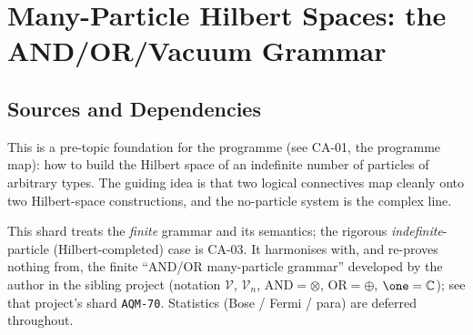 
\section{Many-Particle Hilbert Spaces: the AND/OR/Vacuum Grammar}
\label{sec:and-or-vacuum-grammar}

\subsection{Sources and Dependencies}

This is a pre-topic foundation for the programme (see CA-01, the programme map):
how to build the Hilbert space of an indefinite number of particles of arbitrary
types. The guiding
idea is that two logical connectives map cleanly onto two Hilbert-space
constructions, and the no-particle system is the complex line.


This shard treats the \emph{finite} grammar and its semantics; the rigorous
\emph{indefinite}-particle (Hilbert-completed) case is CA-03. It harmonises with,
and re-proves nothing from, the finite ``AND/OR many-particle grammar'' developed
by the author in the sibling project (notation $\mathcal V$, $\mathcal V_n$,
$\mathrm{AND}=\otimes$, $\mathrm{OR}=\oplus$, $\one=\mathbb C$); see that project's
shard \texttt{AQM-70}. Statistics (Bose / Fermi / para) are deferred throughout.

